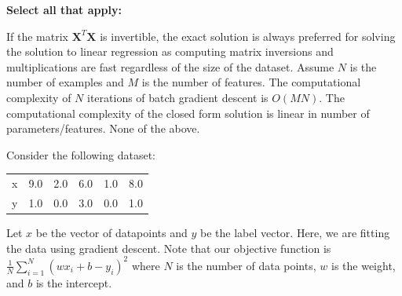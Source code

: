 \documentclass[11pt,addpoints,answers]{exam}
\newcommand{\Xv}{\mathbf{X}}
\begin{document}
\begin{questions}
    \textbf{Select all that apply:}
        {%
    \checkboxchar{$\Box$} \checkedchar{$\blacksquare$}
    \begin{checkboxes}
        \choice If the matrix $\Xv^T\Xv$ is invertible, the exact solution is always preferred for solving the solution to linear regression as computing matrix inversions and multiplications are fast regardless of the size of the dataset.
        \choice Assume $N$ is the number of examples and $M$ is the number of features. The computational complexity of $N$ iterations of batch gradient descent is $O(MN)$.
        \choice The computational complexity of the closed form solution is linear in number of parameters/features.
        \CorrectChoice None of the above.
    \end{checkboxes}
    }
    
    
    
    \newpage
    
    \question[8] \label{Q7_linear_regression} Consider the following dataset:
    \begin{table}[H]
    \centering
        \begin{tabular}{llllll}
        x & 9.0 & 2.0 & 6.0 & 1.0 & 8.0 \\
        y & 1.0 & 0.0 & 3.0 & 0.0 & 1.0
        \end{tabular}
    \end{table}
    Let $x$ be the vector of datapoints and $y$ be the label vector. Here, we are fitting the data using gradient descent. Note that our objective function is $\frac{1}{N}\sum_{i=1}^N (wx_i + b - y_i)^2$ where $N$ is the number of data points, $w$ is the weight, and $b$ is the intercept.
    
\end{questions}
\end{document}
